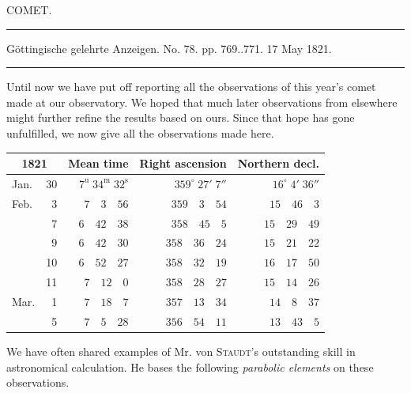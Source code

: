 \clearpage
{}
\hypertarget{native-442-part-lower}{}
\begin{center}
{\large COMET.}

\noindent\rule{\linewidth}{0.4pt}

Göttingische gelehrte Anzeigen. No. 78. pp. 769..771. 17 May 1821.

\noindent\rule{\linewidth}{0.4pt}
\end{center}

Until now we have put off reporting all the observations of this year’s comet made at our observatory. We hoped that much later observations from elsewhere might further refine the results based on ours. Since that hope has gone unfulfilled, we now give all the observations made here.

\begin{center}
\begin{tabular}{lr|r|r|r}
\multicolumn{2}{c|}{1821} & Mean time & Right ascension & Northern decl. \\
\hline
Jan. & 30 & $7^{\mathrm{u}}\;34^{\mathrm{m}}\;32^{\mathrm{s}}$ & $359^\circ\;27'\;7''$ & $16^\circ\;4'\;36''$ \\
Feb. & 3 & $7\quad3\quad56$ & $359\quad3\quad54$ & $15\quad46\quad3$ \\
& 7 & $6\quad42\quad38$ & $358\quad45\quad5$ & $15\quad29\quad49$ \\
& 9 & $6\quad42\quad30$ & $358\quad36\quad24$ & $15\quad21\quad22$ \\
& 10 & $6\quad52\quad27$ & $358\quad32\quad19$ & $16\quad17\quad50$ \\
& 11 & $7\quad12\quad0$ & $358\quad28\quad27$ & $15\quad14\quad26$ \\
Mar. & 1 & $7\quad18\quad7$ & $357\quad13\quad34$ & $14\quad8\quad37$ \\
& 5 & $7\quad5\quad28$ & $356\quad54\quad11$ & $13\quad43\quad5$ \\
\end{tabular}
\end{center}

We have often shared examples of Mr. von \textsc{Staudt}’s outstanding skill in astronomical calculation. He bases the following \emph{parabolic elements} on these observations.

